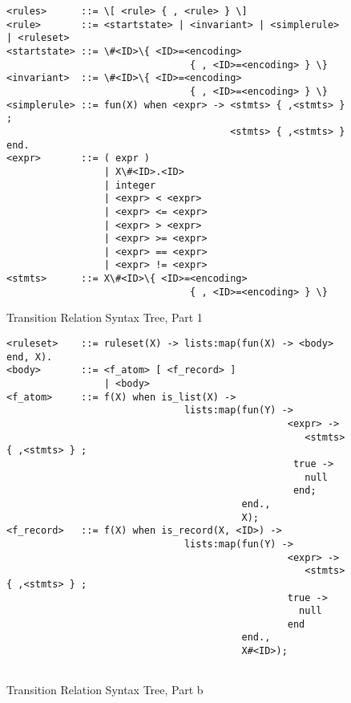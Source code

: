 %
\begin{figure}
\begin{verbatim}
<rules>      ::= \[ <rule> { , <rule> } \]
<rule>       ::= <startstate> | <invariant> | <simplerule> | <ruleset>  
<startstate> ::= \#<ID>\{ <ID>=<encoding> 
                                { , <ID>=<encoding> } \}
<invariant>  ::= \#<ID>\{ <ID>=<encoding> 
                                { , <ID>=<encoding> } \}
<simplerule> ::= fun(X) when <expr> -> <stmts> { ,<stmts> } ; 
                                       <stmts> { ,<stmts> } end.  
<expr>       ::= ( expr )
                 | X\#<ID>.<ID>
                 | integer
                 | <expr> < <expr>
                 | <expr> <= <expr>
                 | <expr> > <expr>
                 | <expr> >= <expr>
                 | <expr> == <expr>
                 | <expr> != <expr>
<stmts>      ::= X\#<ID>\{ <ID>=<encoding> 
                                { , <ID>=<encoding> } \}

\end{verbatim}
\caption{Transition Relation Syntax Tree, Part 1}
\label{TRsta}
\end{figure}
\begin{figure}
\begin{verbatim}
<ruleset>    ::= ruleset(X) -> lists:map(fun(X) -> <body> end, X).
<body>       ::= <f_atom> [ <f_record> ]
                 | <body>
<f_atom>     ::= f(X) when is_list(X) ->
                               lists:map(fun(Y) -> 
                                                 <expr> -> 
                                                    <stmts> { ,<stmts> } ;  
                                                  true ->
                                                    null
                                                  end; 
                                         end., 
                                         X);
<f_record>   ::= f(X) when is_record(X, <ID>) ->
                               lists:map(fun(Y) -> 
                                                 <expr> -> 
                                                    <stmts> { ,<stmts> } ;  
                                                 true ->
                                                   null
                                                 end 
                                         end., 
                                         X#<ID>);
  

\end{verbatim}
\caption{Transition Relation Syntax Tree, Part b}
\label{TRstb}
\end{figure}

